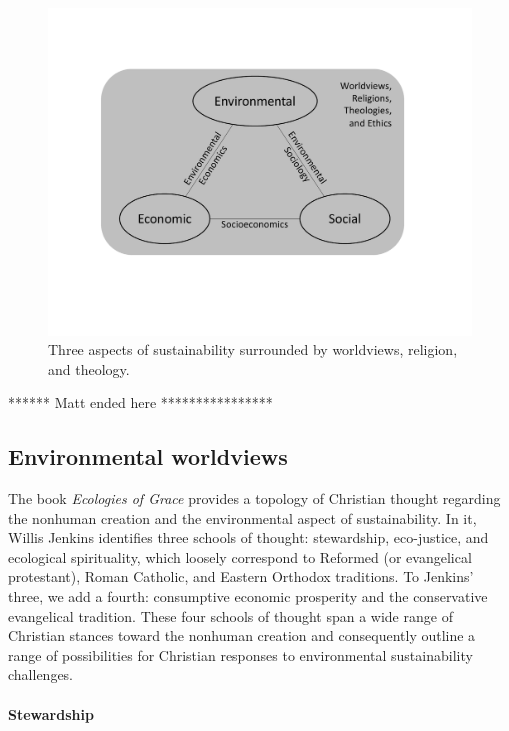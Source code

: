 \documentclass[12pt]{article}
\begin{document}
\begin{figure}
\centering
\includegraphics[width=0.75\linewidth]{figure_other/TriangleDiagramWithTheology.pdf}
\caption{Three aspects of sustainability surrounded by worldviews, religion, and theology.}
\label{fig:3_sustain_with_worldviews}
\end{figure}


****** Matt ended here ****************


\subsection{Environmental worldviews}
\label{sec:environmental}

The book \emph{Ecologies of Grace} \autocite{Jenkins:2008}
provides a topology of Christian thought regarding the 
nonhuman creation and the
environmental aspect of sustainability.
In it, Willis Jenkins identifies three schools of thought:
stewardship, 
eco-justice, and 
ecological spirituality,
which loosely correspond to 
Reformed (or evangelical protestant), 
Roman Catholic, and 
Eastern Orthodox 
traditions.
To Jenkins' three, we add a fourth:
consumptive economic prosperity and
the conservative evangelical tradition. 
These four schools of thought 
span a wide range of Christian stances toward the nonhuman creation
and 
consequently outline a range of possibilities 
for Christian responses to environmental sustainability challenges.

\paragraph{Stewardship} 
\label{sec:stewardship}
\end{document}
